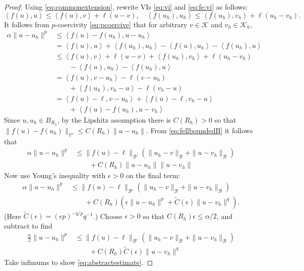 \documentclass[hidelinks,onefignum,onetabnum,final]{siamart220329}  %
\newcommand{\eps}{\epsilon}
\newcommand{\cB}{\mathcal{B}}
\newcommand{\cK}{\mathcal{K}}
\newcommand{\cV}{\mathcal{V}}
\newcommand{\ip}[2]{\left<#1,#2\right>}
\begin{document}
\begin{proof}  Using \eqref{eq:commonextension}, rewrite VIs \eqref{eq:vi} and \eqref{eq:fe:vi} as follows:
    $$\ip{f(u)}{u} \le \ip{f(u)}{v} + \ell(u-v), \quad \ip{f(u_h)}{u_h} \le \ip{f(u_h)}{v_h} + \ell(u_h-v_h).$$
It follows from $p$-coercivity \eqref{eq:pcoercive} that for arbitrary $v\in\cK$ and $v_h\in\cK_h$,
\begin{align*}
\alpha \|u-u_h\|^p &\le \ip{f(u)-f(u_h)}{u-u_h} \\
  &= \ip{f(u)}{u} + \ip{f(u_h)}{u_h} - \ip{f(u)}{u_h} - \ip{f(u_h)}{u} \\
  &\le \ip{f(u)}{v} + \ell(u-v) + \ip{f(u_h)}{v_h} + \ell(u_h-v_h) \\
  &\qquad - \ip{f(u)}{u_h} - \ip{f(u_h)}{u} \\
  &= \ip{f(u)}{v-u_h} - \ell(v-u_h) \\
  &\qquad + \ip{f(u_h)}{v_h-u} - \ell(v_h-u) \\
  &= \ip{f(u)-\ell}{v-u_h} + \ip{f(u)-\ell}{v_h-u} \\
  &\qquad + \ip{f(u)-f(u_h)}{u-v_h}
\end{align*}
Since $u,u_h\in B_{R_h}$, by the Lipshitz assumption there is $C(R_h)>0$ so that $\|f(u)-f(u_h)\|_{\cV'} \le C(R_h) \|u-u_h\|$.  From \eqref{eq:fellboundedB} it follows that
\begin{align*}
\alpha \|u-u_h\|^p &\le \|f(u)-\ell\|_{\cB'} \left(\|u_h-v\|_{\cB} + \|u-v_h\|_{\cB}\right) \\
  &\qquad + C(R_h) \|u-u_h\| \|u-v_h\|
\end{align*}
Now use Young's inequality with $\eps>0$ \cite[Appendix B.2]{Evans2010} on the final term:
\begin{align*}
\alpha \|u-u_h\|^p &\le \|f(u)-\ell\|_{\cB'} \left(\|u_h-v\|_{\cB} + \|u-v_h\|_{\cB}\right) \\
  &\qquad + C(R_h) \left(\eps\|u-u_h\|^p + \tilde C(\eps) \|u-v_h\|^q\right).
\end{align*}
(Here $\tilde C(\eps) = (\eps p)^{-q/p} q^{-1}$.)  Choose $\eps>0$ so that $C(R_h) \eps \le \alpha/2$, and subtract to find
\begin{align*}
\frac{\alpha}{2} \|u-u_h\|^p &\le \|f(u)-\ell\|_{\cB'} \left(\|u_h-v\|_{\cB} + \|u-v_h\|_{\cB}\right) \\
  &\qquad + C(R_h) \tilde C(\eps) \|u-v_h\|^q
\end{align*}
Take infimums to show \eqref{eq:abstractestimate}.
\end{proof}
\end{document}
